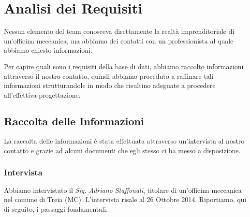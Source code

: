 \section{Analisi dei Requisiti}

	Nessun elemento del team conosceva direttamente la realtà imprenditoriale di un'officina meccanica, ma abbiamo dei contatti con un professionista al quale abbiamo chiesto informazioni. 
	
	Per capire quali sono i requisiti della base di dati, abbiamo raccolto informazioni attraverso il nostro contatto, quindi abbiamo proceduto a raffinare tali informazioni strutturandole in modo che risultino adeguate a procedere all'effettiva progettazione.
	
	\subsection{Raccolta delle Informazioni}
		
		La raccolta delle informazioni è stata effettuata attraverso un'intervista al nostro contatto e grazie ad alcuni documenti che egli stesso ci ha messo a disposizione. 
	
		\subsubsection{Intervista}
		Abbiamo intervistato il \emph{Sig. Adriano Staffonali}, titolare di un'officina meccanica nel comune di Treia (MC). L'intervista risale al 26 Ottobre 2014. Riportiamo, qui di seguito, i passaggi fondamentali.

